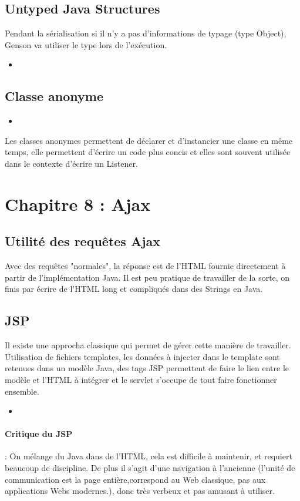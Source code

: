 \documentclass{article}[12pt]
\newcommand{\JavaScript}[2]{
	\begin{itemize}
		\item[]
	\end{itemize}
}
\begin{document}
\subsection{Untyped Java Structures}
Pendant la sérialisation si il n'y a pas d'informations de typage (type Object), Genson va utiliser le type lors de l'exécution.
\JavaScript{untyped_java}{Exemple de Structure Java Untyped}
\subsection{Classe anonyme}
\JavaScript{classe_anonyme}{Exemple de classe anonyme}
Les classes anonymes permettent de déclarer et d'instancier une classe en même temps, elle permettent d'écrire un code plus concis et elles sont souvent utilisée dans le contexte d'écrire un Listener.
\section{Chapitre 8 : Ajax}
\subsection{Utilité des requêtes Ajax}
Avec des requêtes "normales", la réponse est de l'HTML fournie directement à partir de l'implémentation Java. Il est peu pratique de travailler de la sorte, on finis par écrire de l'HTML long et compliqués dans des Strings en Java.
\subsection{JSP}
Il existe une approcha classique qui permet de gérer cette manière de travailler. Utilisation de fichiers templates, les données à injecter dans le template sont retenues dans un modèle Java, des tags JSP permettent de faire le lien entre le modèle et l'HTML à intégrer et le servlet s'occupe de tout faire fonctionner ensemble.
\JavaScript{exempleJSP}{Exemple JSP}
\paragraph{Critique du JSP} : On mélange du Java dans de l'HTML, cela est difficile à maintenir, et requiert beaucoup de discipline. De plus il s'agit d'une navigation à l'ancienne (l'unité de communication est la page entière,correspond au Web classique, pas aux applications Webs modernes.), donc très verbeux et pas amusant à utiliser. 
\end{document}
